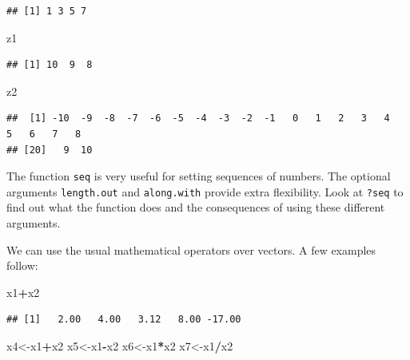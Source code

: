 \documentclass[
]{article}
\newenvironment{Shaded}{\begin{snugshade}}{\end{snugshade}}
\newcommand{\NormalTok}[1]{#1}
\newcommand{\OtherTok}[1]{\textcolor[rgb]{0.56,0.35,0.01}{#1}}
\newcommand{\SpecialCharTok}[1]{\textcolor[rgb]{0.81,0.36,0.00}{\textbf{#1}}}
\begin{document}
\begin{verbatim}
## [1] 1 3 5 7
\end{verbatim}

\begin{Shaded}
\begin{Highlighting}[]
\NormalTok{z1}
\end{Highlighting}
\end{Shaded}

\begin{verbatim}
## [1] 10  9  8
\end{verbatim}

\begin{Shaded}
\begin{Highlighting}[]
\NormalTok{z2}
\end{Highlighting}
\end{Shaded}

\begin{verbatim}
##  [1] -10  -9  -8  -7  -6  -5  -4  -3  -2  -1   0   1   2   3   4   5   6   7   8
## [20]   9  10
\end{verbatim}

The function \texttt{seq} is very useful for setting sequences of
numbers. The optional arguments \texttt{length.out} and
\texttt{along.with} provide extra flexibility. Look at \texttt{?seq} to
find out what the function does and the consequences of using these
different arguments.

We can use the usual mathematical operators over vectors. A few examples
follow:

\begin{Shaded}
\begin{Highlighting}[]
\NormalTok{x1}\SpecialCharTok{+}\NormalTok{x2}
\end{Highlighting}
\end{Shaded}

\begin{verbatim}
## [1]   2.00   4.00   3.12   8.00 -17.00
\end{verbatim}

\begin{Shaded}
\begin{Highlighting}[]
\NormalTok{x4}\OtherTok{\textless{}{-}}\NormalTok{x1}\SpecialCharTok{+}\NormalTok{x2}
\NormalTok{x5}\OtherTok{\textless{}{-}}\NormalTok{x1}\SpecialCharTok{{-}}\NormalTok{x2}
\NormalTok{x6}\OtherTok{\textless{}{-}}\NormalTok{x1}\SpecialCharTok{*}\NormalTok{x2}
\NormalTok{x7}\OtherTok{\textless{}{-}}\NormalTok{x1}\SpecialCharTok{/}\NormalTok{x2}
\end{Highlighting}
\end{Shaded}
\end{document}

